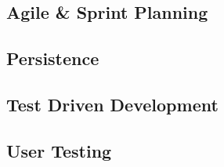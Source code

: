 \documentclass{article}
\begin{document}
\subsection{Agile \& Sprint Planning}

\subsection{Persistence}

\subsection{Test Driven Development}

\subsection{User Testing}
\end{document}
